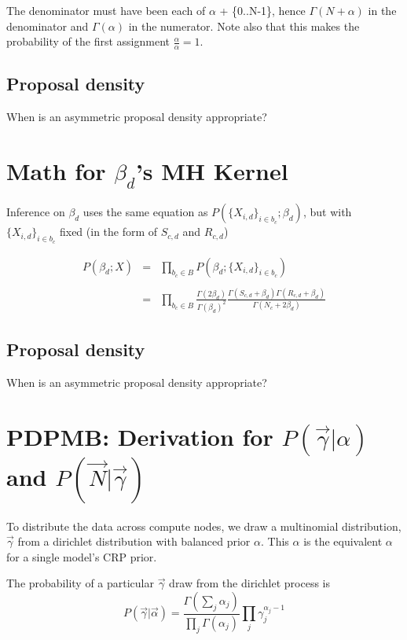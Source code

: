 \documentclass{article}
\begin{document}
The denominator must have been each of $\alpha$ + \{0..N-1\}, hence $\Gamma(N+\alpha)$ in the denominator and $\Gamma(\alpha)$ in the numerator.  Note also that this makes the probability of the first assignment $\frac{\alpha}{\alpha}=1$.

\subsection{Proposal density}

When is an asymmetric proposal density appropriate?

\section{Math for $\beta_d$'s MH Kernel}

Inference on $\beta_d$ uses the same equation as $P(\{X_{i,d}\}_{i \in b_c};\beta_d)$, but with $\{X_{i,d}\}_{i \in b_c}$ fixed (in the form of $S_{c,d}$ and $R_{c,d}$)

\begin{equation}
\begin{matrix}
P(\beta_d;X) & = & \prod_{b_c \in B} P(\beta_d;\{X_{i,d}\}_{i \in b_c}) \\
\\
 & = & \prod_{b_c \in B} \frac{\Gamma(2\beta_d)}{\Gamma(\beta_d)^2} \frac{\Gamma(S_{c,d} + \beta_d)\Gamma(R_{c,d} + \beta_d)}{\Gamma(N_c + 2 \beta_d)}
\end{matrix}
\end{equation}

\subsection{Proposal density}

When is an asymmetric proposal density appropriate?


\section{PDPMB: Derivation for $P(\vec \gamma|\alpha)$ and $P(\vec N|\vec \gamma)$}

To distribute the data across compute nodes, we draw a multinomial distribution, $\vec \gamma$ from a dirichlet distribution with balanced prior $\alpha$.  This $\alpha$ is the equivalent $\alpha$ for a single model's CRP prior.

The probability of a particular $\vec \gamma$ draw from the dirichlet process is
\begin{equation}
P(\vec \gamma|\vec \alpha) = \frac{\Gamma(\sum_j \alpha_j)}{\prod_j \Gamma(\alpha_j)} \prod_j \gamma_j^{\alpha_j-1}
\end{equation}
\end{document}
